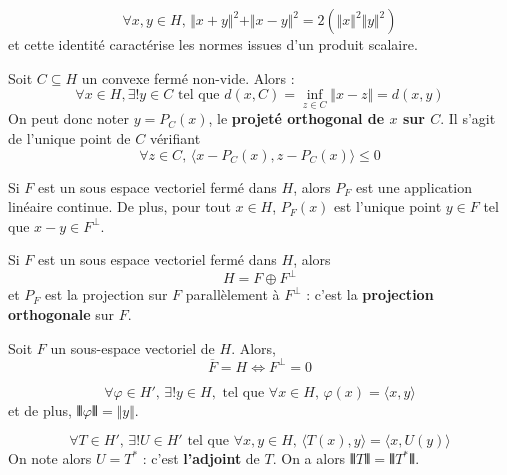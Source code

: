   \begin{lemma}
    \[ \forall x, y \in H, \, \Vert x + y \Vert^2 + \Vert x - y \Vert^2 = 2(\Vert x \Vert^2 \Vert y \Vert^2) \]
    et cette identité caractérise les normes issues d'un produit scalaire.
  \end{lemma}


  \begin{theorem}
    Soit $C \subseteq H$ un convexe fermé non-vide. Alors :
    \[ \forall x \in H, \exists! y \in C \text{ tel que } d(x, C) = \inf_{z \in C} \Vert x - z \Vert = d(x, y) \]
    On peut donc noter $y = P_C(x)$, le \textbf{projeté orthogonal de $x$ sur $C$}. Il s'agit de l'unique point de $C$ vérifiant
    \[ \forall z \in C, \, \langle x - P_C(x), z - P_C(x) \rangle \leq 0 \]
  \end{theorem}

  \begin{theorem}
    Si $F$ est un sous espace vectoriel fermé dans $H$, alors $P_F$ est une application linéaire continue. De plus, pour tout $x \in H$, $P_F(x)$ est l'unique point $y \in F$ tel que $x-y \in F^\perp$.
  \end{theorem}

  \begin{theorem}
    Si $F$ est un sous espace vectoriel fermé dans $H$, alors
    \[ H = F \oplus F^\perp \]
    et $P_F$ est la projection sur $F$ parallèlement à $F^\perp$ : c'est la \textbf{projection orthogonale} sur $F$.
  \end{theorem}

  \begin{corollary}
    Soit $F$ un sous-espace vectoriel de $H$. Alors,
    \[ \overline{F} = H \iff F^\perp = 0 \]
  \end{corollary}

  \begin{theorem}
    \[ \forall \varphi \in H', \, \exists! y \in H, \text{ tel que } \forall x \in H, \, \varphi(x) = \langle x, y \rangle \]
    et de plus, $\VERT \varphi \VERT = \Vert y \Vert$.
  \end{theorem}

  \begin{corollary}
    \[ \forall T \in H', \, \exists! U \in H' \text{ tel que } \forall x, y \in H, \, \langle T(x), y \rangle = \langle x, U(y) \rangle \]
    On note alors $U = T^*$ : c'est \textbf{l'adjoint} de $T$. On a alors $\VERT T \VERT = \VERT T^* \VERT$.
  \end{corollary}


